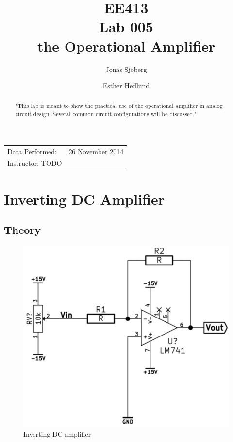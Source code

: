 \documentclass[]{article}
\title{EE413 \\ Lab 005 \\ the Operational Amplifier}
\author{{Jonas Sjöberg} \and {Esther Hedlund}}
\date{}
\begin{document}
\maketitle

\begin{center}
\begin{tabular}{l r}
    Data Performed: & 26 November 2014 \\
    Instructor: TODO
\end{tabular}
\end{center}

\begin{abstract}
"This lab is meant to show the practical use of the operational amplifier in
analog circuit design. Several common circuit configurations will be discussed."
\end{abstract}


\newpage

\section{Inverting DC Amplifier}\label{inverting-dc-amplifier}

\subsection{Theory}\label{theory}

\begin{figure}[htbp]
    \centering
        \includegraphics{img/invDCamp.png}
    \caption{Inverting DC amplifier}
    \label{fig:invDCamp}
\end{figure}
\end{document}
